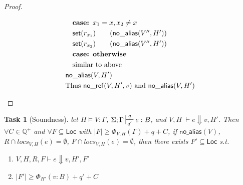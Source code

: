 \documentclass[11pt]{article}
\newcounter{group}
\newtheorem{theorem}{Task}[group]
\newcommand{\ms}[1]{\ensuremath{\mathsf{#1}}}
\newcommand{\na}[1]{\mathsf{no\_alias}(#1)}
\newcommand{\nr}[1]{\mathsf{no\_ref}(#1)}
\begin{document}
\begin{proof}
\begin{description}
\begin{align*}
  &\quad \textbf{case: } x_1 = x, x_2 \ne x\\
  &\quad \ms{set}(r_{x_1}) \tag{$\na{V'',H'}$}\\
  &\quad \ms{set}(r_{x_2}) \tag{$\na{V'',H'}$}\\
  &\quad \textbf{case: otherwise}\\ 
  &\quad \text{similar to above}\\
  &\na{V,H'}\\
  &\text{Thus } \nr{V,H',v} \text{ and } \na{V,H'}\\
  \end{align*}
  \end{description}
\end{proof}

\begin{theorem}[Soundness]
\label{b} let $H \vDash V : \Gamma$, $\Sigma; \Gamma \sststile{q'}{q} e : B$,
and $V,H \; \vdash e \Downarrow v, H'$. Then $\forall C \in \mathbb{Q}^{+}$ and $\forall F \subseteq \ms{Loc}$ with $|F| \ge \Phi_{V,H}(\Gamma) + q + C$,  if $\na{V}$, $R \cap locs_{V,H}(e) = \emptyset$,  $F \cap locs_{V,H}(e) = \emptyset$, then there exists $F' \subseteq \ms{Loc}$ s.t.
\begin{enumerate}
  \item $V,H,R,F \vdash e \Downarrow v, H', F'$
  \item $|F'| \ge \Phi_{H'}(v:B) + q' + C$
\end{enumerate}
\end{theorem}
\end{document}
